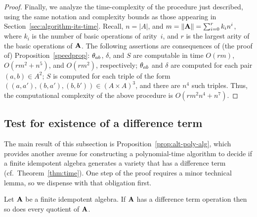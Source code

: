 \documentclass{ws-ijac}
\begin{document}
\begin{proof}
  Finally, we analyze the time-complexity of the procedure just described,
  using the same notation and complexity bounds as those appearing in
  Section~\ref{sec:algorithm-its-time}.  Recall, $n = |A|$, and
  $m=\|\mathbf{A}\| = \sum_{i=0}^r k_i n^i$, where $k_i$ is the number of basic
  operations of arity~$i$, and $r$ is the largest arity of the basic
  operations of $\mathbf{A}$. The following assertions are consequences of (the
  proof of) Proposition~\ref{speedprop}: $\theta_{ab}$,
  $\delta$, and $S$ are computable in time $O(rm)$, $O(rm^2 + n^5)$,
  and $O(rm^2)$, respectively;
  $\theta_{ab}$ and $\delta$ are computed for each pair $(a,b) \in A^2$;
  $S$ is computed for each triple of the form
  $((a,a'),(b,a'),(b,b'))\in (A\times A)^3$, and there are $n^4$ such triples.
  Thus, the computational complexity of the above procedure is
  $O(rm^2n^4 + n^7)$.
\end{proof}

\subsection{Test for existence of a difference term}
\label{sec:diffterm-test}
The main result of this subsection is Proposition~\ref{prop:alt-poly-alg}, which provides another avenue for constructing a polynomial-time algorithm to decide if a finite idempotent algebra generates a variety that has a difference term (cf.~Theorem~\ref{thm:time}).
One step of the proof requires a minor technical lemma, so we dispense with that obligation first.
\begin{lemma} \label{lem:dt-quotients}
  Let $\mathbf{A}$ be a finite idempotent algebra.
  If $\mathbf{A}$ has a difference term operation then so does every quotient of $\mathbf{A}$.
\end{lemma}
\end{document}
